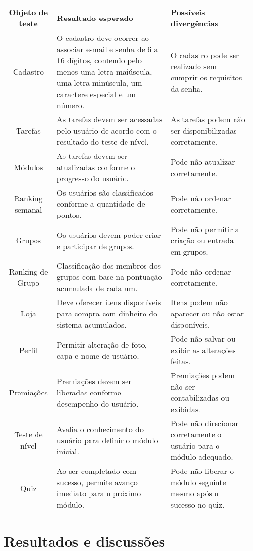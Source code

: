 \documentclass[
	article,			%
	12pt,				%
	oneside,			%
	a4paper,			%
	english,			%
	brazil,				%
	sumario=tradicional
	]{abntex2}
\begin{document}
\begin{center}
\begin{tabular}{|c|p{5.5cm}|p{6.5cm}|}
\hline
\textbf{Objeto de teste} & \textbf{Resultado esperado} & \textbf{Possíveis divergências} \\
\hline
Cadastro & O cadastro deve ocorrer ao associar e-mail e senha de 6 a 16 dígitos, contendo pelo menos uma letra maiúscula, uma letra minúscula, um caractere especial e um número. & O cadastro pode ser realizado sem cumprir os requisitos da senha. \\
\hline
Tarefas & As tarefas devem ser acessadas pelo usuário de acordo com o resultado do teste de nível. & As tarefas podem não ser disponibilizadas corretamente. \\
\hline
Módulos & As tarefas devem ser atualizadas conforme o progresso do usuário. & Pode não atualizar corretamente. \\
\hline
Ranking semanal & Os usuários são classificados conforme a quantidade de pontos. & Pode não ordenar corretamente. \\
\hline
Grupos & Os usuários devem poder criar e participar de grupos. & Pode não permitir a criação ou entrada em grupos. \\
\hline
Ranking de Grupo & Classificação dos membros dos grupos com base na pontuação acumulada de cada um. & Pode não ordenar corretamente. \\
\hline
Loja & Deve oferecer itens disponíveis para compra com dinheiro do sistema acumulados. & Itens podem não aparecer ou não estar disponíveis. \\
\hline
Perfil & Permitir alteração de foto, capa e nome de usuário. & Pode não salvar ou exibir as alterações feitas. \\
\hline
Premiações & Premiações devem ser liberadas conforme desempenho do usuário. & Premiações podem não ser contabilizadas ou exibidas. \\
\hline
Teste de nível & Avalia o conhecimento do usuário para definir o módulo inicial. & Pode não direcionar corretamente o usuário para o módulo adequado. \\
\hline
Quiz & Ao ser completado com sucesso, permite avanço imediato para o próximo módulo. & Pode não liberar o módulo seguinte mesmo após o sucesso no quiz. \\
\hline
\end{tabular}
\end{center}

\section{Resultados e discussões}
\end{document}
